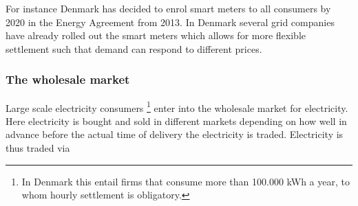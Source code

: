 For instance Denmark has decided to enrol smart meters to all consumers by 2020 in the Energy Agreement from 2013. In Denmark several grid companies have already rolled out the smart meters which allows for more flexible settlement such that demand can respond to different prices. %

\subsubsection{The wholesale market}
\label{subsubsec: t_whomarket}
Large scale electricity consumers \footnote{In Denmark this entail firms that consume more than 100.000 kWh  a year, to whom hourly settlement is obligatory.} enter into the wholesale market for electricity. Here electricity is bought and sold in different markets depending on how well in advance before the actual time of delivery the electricity is traded. Electricity is thus traded via

